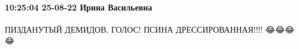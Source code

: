  
 
 
 
 

\paragraph{10:25:04 25-08-22 Ирина Васильевна}

ПИЗДАНУТЫЙ ДЕМИДОВ, ГОЛОС!
ПСИНА ДРЕССИРОВАННАЯ!!!! 😂😂😂🤣🤣🤣😂
